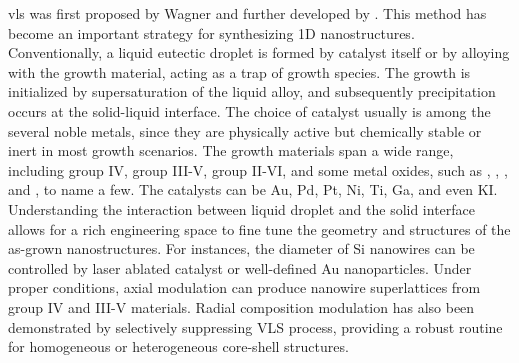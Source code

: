 \gls{vls} was first proposed by Wagner\cite{Wagner1964} and further developed by \citeauthor{Givargizov1975}.\cite{Givargizov1975} This method has become an important strategy for synthesizing 1D nanostructures.\cite{Lieber1998} Conventionally, a liquid eutectic droplet is formed by catalyst itself or by alloying with the growth material, acting as a trap of growth species. The growth is initialized by supersaturation of the liquid alloy, and subsequently precipitation occurs at the solid-liquid interface. The choice of catalyst usually is among the several noble metals, since they are physically active but chemically stable or inert in most growth scenarios. The growth materials span a wide range, including group IV,\cite{Hochbaum2005} group III-V,\citep{Dalacu2013, Xiao2012, Dubrovskii2011} group II-VI,\cite{Hao2006} and some metal oxides, such as ,\citep{Huang2001a,Ramgir2010} ,\citep{HEUER1967, Nagashima2007} ,\cite{Pan2002} and ,\cite{Zhuge2012} to name a few. The catalysts can be Au, Pd, Pt, Ni,\cite{Xiao2012} Ti, Ga,\cite{Pan2002} and even KI. Understanding the interaction between liquid droplet and the solid interface allows for a rich engineering space to fine tune the geometry and structures of the as-grown nanostructures. For instances, the diameter of Si nanowires can be controlled by laser ablated catalyst\cite{Morales1998} or well-defined Au nanoparticles.\cite{Cui2001b} Under proper conditions, axial modulation can produce nanowire superlattices from group IV and III-V materials.\citep{Gudiksen2002,Bjork2002} Radial composition modulation has also been demonstrated by selectively suppressing VLS process, providing a robust routine for homogeneous or heterogeneous core-shell structures.\cite{Lauhon2002a}  

